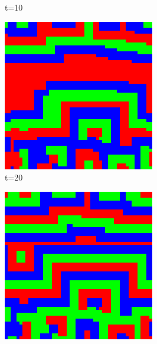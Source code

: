 \documentclass[a4paper, 11pt]{article}
\begin{document}
\begin{landscape}
\begin{figure}[H]
\begin{subfigure}{.20\textwidth}
  \caption{t=10}
\end{subfigure}%
\begin{subfigure}{.20\textwidth}
  \centering
  \includegraphics[width=0.95\linewidth]{ROCK_PAPER_SCISSORS_MOORE_50x50_HighRockPop50_t20}
  \caption{t=20}
\end{subfigure}%
\begin{subfigure}{.20\textwidth}
  \centering
  \includegraphics[width=0.95\linewidth]{ROCK_PAPER_SCISSORS_MOORE_50x50_HighRockPop50_t50}

\end{subfigure}
\end{figure}
\end{landscape}
\end{document}

